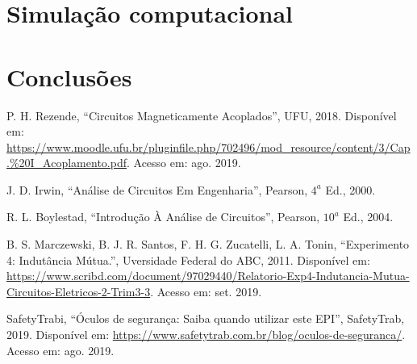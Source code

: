 \documentclass[a4paper,12pt,oneside,openany,table,xcdraw]{article}
\begin{document}
\section{Simulação computacional} %


\section{Conclusões} %


\newpage
\begin{thebibliography}{9} 
    P. H. Rezende,
    “Circuitos Magneticamente Acoplados”, UFU, 2018.
 Disponível em:
 \url{https://www.moodle.ufu.br/pluginfile.php/702496/mod_resource/content/3/Cap.\%20I_Acoplamento.pdf}. Acesso em: ago. 2019.

    J. D. Irwin,
    “Análise de Circuitos Em Engenharia”, Pearson, $4^a$ Ed., 2000.

    R. L. Boylestad,
    “Introdução À Análise de Circuitos”, Pearson, $10^a$ Ed., 2004.

    B. S. Marczewski, B. J. R. Santos, F. H. G. Zucatelli, L. A. Tonin,
    “Experimento 4: Indutância Mútua.”, Uversidade Federal do ABC, 2011.
 Disponível em:
 \url{https://www.scribd.com/document/97029440/Relatorio-Exp4-Indutancia-Mutua-Circuitos-Eletricos-2-Trim3-3}. Acesso em: set. 2019.

    SafetyTrabi,
    “Óculos de segurança: Saiba quando utilizar este EPI”, SafetyTrab, 2019.
 Disponível em:
 \url{https://www.safetytrab.com.br/blog/oculos-de-seguranca/}. Acesso em: ago. 2019.


\end{thebibliography}
\end{document}
